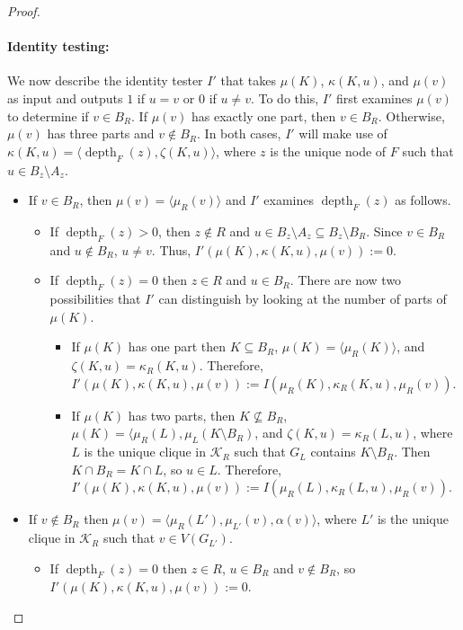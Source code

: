 \documentclass{patmorin}
\DeclareMathOperator{\depth}{depth}
\newcommand{\calK}{\mathcal{K}}
\begin{document}
\begin{proof}
    \paragraph{Identity testing:}  We now describe the identity tester $I'$ that takes $\mu(K)$, $\kappa(K,u)$, and $\mu(v)$ as input and outputs $1$ if $u=v$ or $0$ if $u\neq v$.  To do this, $I'$ first examines $\mu(v)$ to determine if $v\in B_R$.  If $\mu(v)$ has exactly one part, then $v\in B_R$. Otherwise, $\mu(v)$ has three parts and $v\not\in B_R$.
    In both cases, $I'$ will make use of $\kappa(K,u)=\langle\depth_F(z),\zeta(K,u)\rangle$, where $z$ is the unique node of $F$ such that $u\in B_z\setminus A_z$.
    \begin{itemize}
      \item If $v\in B_R$, then $\mu(v)=\langle\mu_R(v)\rangle$ and $I'$ examines  $\depth_F(z)$ as follows.
      \begin{itemize}
        \item If $\depth_F(z)> 0$, then $z\not\in R$ and $u\in B_z\setminus A_z\subseteq B_z\setminus B_R$.  Since $v\in B_R$ and $u\not\in B_R$, $u\neq v$.  Thus, $I'(\mu(K),\kappa(K,u),\mu(v)):=0$.

        \item If $\depth_F(z)=0$ then $z\in R$ and $u\in B_R$.   There are now two possibilities that $I'$ can distinguish by looking at the number of parts of $\mu(K)$.
        \begin{itemize}
          \item If $\mu(K)$ has one part then $K\subseteq B_R$,  $\mu(K)=\langle \mu_R(K)\rangle$, and $\zeta(K,u)=\kappa_R(K,u)$.  Therefore, $I'(\mu(K),\kappa(K,u),\mu(v)):=I(\mu_R(K),\kappa_R(K,u),\mu_R(v))$.
          \item If $\mu(K)$ has two parts, then $K\not\subseteq B_R$, $\mu(K)=\langle \mu_R(L),\mu_L(K\setminus B_R)$, and  $\zeta(K,u)=\kappa_R(L,u)$, where $L$ is the unique clique in $\calK_R$ such that $G_L$ contains $K\setminus B_R$.  Then $K\cap B_R=K\cap L$, so $u\in L$. Therefore, $I'(\mu(K),\kappa(K,u),\mu(v)):=I(\mu_R(L),\kappa_R(L,u),\mu_R(v))$.
      \end{itemize}
      \end{itemize}
      \item If $v\not\in B_R$ then $\mu(v)=\langle \mu_R(L'),\mu_{L'}(v),\alpha(v)\rangle$, where $L'$ is the unique clique in $\calK_R$ such that $v\in V(G_{L'})$.
      \begin{itemize}
          \item If $\depth_F(z)=0$ then $z\in R$, $u\in B_R$ and $v\not\in B_R$, so $I'(\mu(K),\kappa(K,u),\mu(v)):=0$.


\end{itemize}
\end{itemize}
\end{proof}
\end{document}

